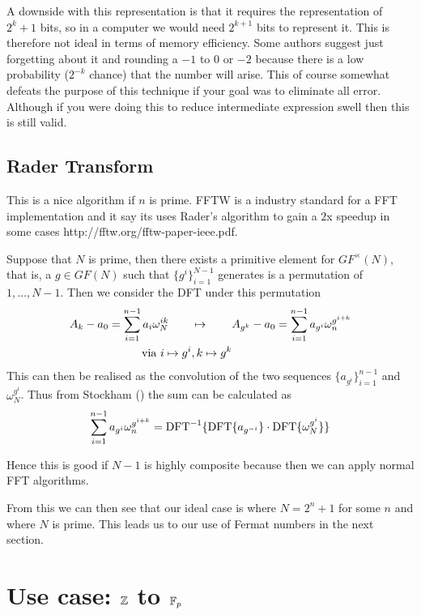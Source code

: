 A downside with this representation is that it requires the representation of $2^k + 1$ bits, so in a computer we would need $2^{k+1}$ bits to represent it. This is therefore not ideal in terms of memory efficiency. Some authors suggest just forgetting about it and rounding a $-1$ to $0$ or $-2$ because there is a low probability ($2^{-k}$ chance) that the number will arise. This of course somewhat defeats the purpose of this technique if your goal was to eliminate all error. Although if you were doing this to reduce intermediate expression swell then this is still valid.

\subsection{Rader Transform}
\label{subsec:rt}

This is a nice algorithm if $n$ is prime. FFTW is a industry standard for a FFT implementation and it say its uses Rader's algorithm to gain a $2$x speedup in some cases http://fftw.org/fftw-paper-ieee.pdf.

\begin{theorem}\label{thm:rader-transform}
    Suppose that $N$ is prime, then there exists a primitive element for $GF^\times(N)$, that is, a $g \in GF(N)$ such that $\{g^i\}_{i=1}^{N-1}$ generates is a permutation of $1, \ldots, N-1$. Then we consider the DFT under this permutation
    \begin{align*}
      A_k - a_0 = \sum^{n-1}_{i=1} a_i \omega_N^{ik} \qquad &\mapsto \qquad A_{g^k} - a_0 = \sum^{n-1}_{i=1} a_{g^i}\omega_n^{g^{i+k}}\\
      \textrm{ via } i \mapsto g^i&, k \mapsto g^k
    \end{align*}
    This can then be realised as the convolution of the two sequences $\{a_{g^i}\}_{i=1}^{n-1}$ and $\omega_N^{g^i}$. Thus from Stockham (\cite{stockham}) the sum can be calculated as
    \[
      \sum^{n-1}_{i=1} a_{g^i}\omega_n^{g^{i+k}} = \textrm{DFT}^{-1}\{\textrm{DFT}\{a_{g^{-i}}\}\cdot \textrm{DFT}\{\omega_N^{g^i}\}\}
    \]
\end{theorem}
Hence this is good if $N - 1$ is highly composite because then we can apply normal FFT algorithms.

From this we can then see that our ideal case is where $N = 2^n + 1$ for some $n$ and where $N$ is prime. This leads us to our use of Fermat numbers in the next section.

\section{Use case: ${\mathbb Z}$ to $\mathbb{F}_p$}\label{sec:Z-Fp}

